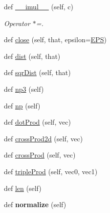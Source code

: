 \begin{DoxyCompactItemize}
\mbox{\label{classgeometry_1_1Point_a07650758ee8b4493ac73042817e98aa5}} 
def \hyperlink{classgeometry_1_1Point_a07650758ee8b4493ac73042817e98aa5}{\+\_\+\+\_\+imul\+\_\+\+\_\+} (self, c)
\begin{DoxyCompactList}\small\item\em Operator $\ast$=. \end{DoxyCompactList}\item 
def \hyperlink{classgeometry_1_1Point_ab9ec6d1fd080ba8b7eb99e5832505c85}{close} (self, that, epsilon=\hyperlink{namespacegeometry_a543db87a5e9af9e1d17146559a540276}{E\+PS})
\item 
def \hyperlink{classgeometry_1_1Point_a8da689422b3b004369e1467f8123e8a7}{dist} (self, that)
\item 
def \hyperlink{classgeometry_1_1Point_a28f393df5b0c4a297157a3ae55f1f4a3}{sqr\+Dist} (self, that)
\item 
def \hyperlink{classgeometry_1_1Point_a12ce9dea666d1b40218822a89bada540}{np3} (self)
\item 
def \hyperlink{classgeometry_1_1Point_a133d82361f16f975fcb232ba41ff5562}{np} (self)
\item 
def \hyperlink{classgeometry_1_1Point_a4df6e13ff003843f967090fb7f51cc85}{dot\+Prod} (self, vec)
\item 
def \hyperlink{classgeometry_1_1Point_ae6747fdae2c6ec09961298171862ef4b}{cross\+Prod2d} (self, vec)
\item 
def \hyperlink{classgeometry_1_1Point_aa9a3448e0da24f3132a4ccc7abf191a7}{cross\+Prod} (self, vec)
\item 
def \hyperlink{classgeometry_1_1Point_acce6c690969f757d26e4a544955cb8f4}{triple\+Prod} (self, vec0, vec1)
\item 
def \hyperlink{classgeometry_1_1Point_ae6b226778d9c084c9369faa6dfd95398}{len} (self)
\item 
\mbox{\label{classgeometry_1_1Point_a902f60cc3736617d3846e137a1efef80}} 
def {\bfseries normalize} (self)
\end{DoxyCompactItemize}
